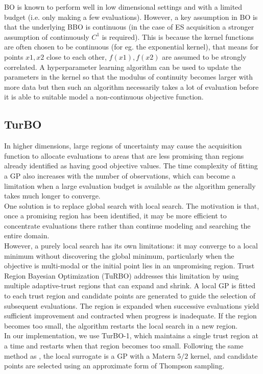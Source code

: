 \documentclass[12pt]{article}
\begin{document}
BO is known to perform well in low dimensional settings and with a limited budget (i.e. only making a few evaluations). However, a key assumption in BO is that the underlying BBO is continuous (in the case of ES acquisition a stronger assumption of continuously $C^1$ is required). This is because the kernel functions are often chosen to be continuous (for eg. the exponential kernel), that means for points $x1,x2$ close to each other, $f(x1), f(x2)$ are assumed to be strongly correlated. A hyperparameter learning algorithm can be used to update the parameters in the kernel so that the modulus of continuity becomes larger with more data but then such an algorithm necessarily takes a lot of evaluation before it is able to suitable model a non-continuous objective function.
\subsection{TurBO}
In higher dimensions, large regions of uncertainty may cause the acquisition function to allocate evaluations to areas that are less promising than regions
already identified as having good objective values. The time complexity of fitting a GP also increases with the number of observations, which can become a limitation when a large evaluation budget is available as the algorithm generally takes much longer to converge.\\

One solution is to replace global search with local search. The motivation is that, once a promising region has been identified, it may be more efficient to concentrate evaluations there rather than
continue modeling and searching the entire domain.\\  

However, a purely local search has its own limitations: it may converge to a local minimum without discovering the global minimum, particularly when the objective is multi-modal or the initial point lies in an unpromising region. Trust Region Bayesian Optimization (TuRBO) addresses this limitation by using multiple adaptive-trust regions that can expand and shrink. A local GP is fitted to each trust region and candidate points are generated to guide the selection of subsequent evaluations.
The region is expanded when successive evaluations yield sufficient
improvement and contracted when progress is inadequate. If the region
becomes too small, the algorithm restarts the local search in a new
region.\\ 

In our implementation, we use TurBO-1, which maintains a single trust region at a time and restarts when that region becomes too small. Following the same method as \cite{turboarticle}, the local surrogate is a GP with a Matern $5/2$ kernel, and candidate points are selected using an approximate form of Thompson sampling.
\end{document}
